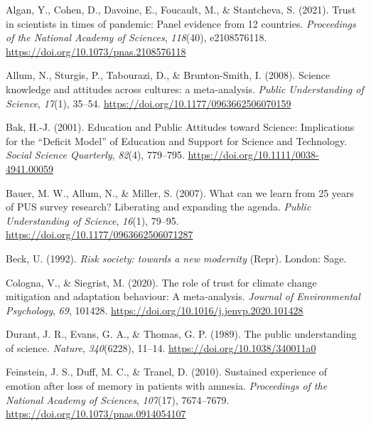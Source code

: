 \documentclass[
  doc,floatsintext]{apa6}
\newlength{\cslhangindent}
\newenvironment{CSLReferences}[2] %
 {\begin{list}{}{%
  \setlength{\itemindent}{0pt}
  \setlength{\leftmargin}{0pt}
  \setlength{\parsep}{0pt}
  \ifodd #1
   \setlength{\leftmargin}{\cslhangindent}
   \setlength{\itemindent}{-1\cslhangindent}
  \fi
  \setlength{\itemsep}{#2\baselineskip}}}
 {\end{list}}
\begin{document}
\label{refs}
\begin{CSLReferences}{1}{0}
Algan, Y., Cohen, D., Davoine, E., Foucault, M., \& Stantcheva, S. (2021). Trust in scientists in times of pandemic: Panel evidence from 12 countries. \emph{Proceedings of the National Academy of Sciences}, \emph{118}(40), e2108576118. \url{https://doi.org/10.1073/pnas.2108576118}

Allum, N., Sturgis, P., Tabourazi, D., \& Brunton-Smith, I. (2008). Science knowledge and attitudes across cultures: a meta-analysis. \emph{Public Understanding of Science}, \emph{17}(1), 35--54. \url{https://doi.org/10.1177/0963662506070159}

Bak, H.-J. (2001). Education and Public Attitudes toward Science: Implications for the {``}Deficit Model{''} of Education and Support for Science and Technology. \emph{Social Science Quarterly}, \emph{82}(4), 779--795. \url{https://doi.org/10.1111/0038-4941.00059}

Bauer, M. W., Allum, N., \& Miller, S. (2007). What can we learn from 25 years of PUS survey research? Liberating and expanding the agenda. \emph{Public Understanding of Science}, \emph{16}(1), 79--95. \url{https://doi.org/10.1177/0963662506071287}

Beck, U. (1992). \emph{Risk society: towards a new modernity} (Repr). London: Sage.

Cologna, V., \& Siegrist, M. (2020). The role of trust for climate change mitigation and adaptation behaviour: A meta-analysis. \emph{Journal of Environmental Psychology}, \emph{69}, 101428. \url{https://doi.org/10.1016/j.jenvp.2020.101428}

Durant, J. R., Evans, G. A., \& Thomas, G. P. (1989). The public understanding of science. \emph{Nature}, \emph{340}(6228), 11--14. \url{https://doi.org/10.1038/340011a0}

Feinstein, J. S., Duff, M. C., \& Tranel, D. (2010). Sustained experience of emotion after loss of memory in patients with amnesia. \emph{Proceedings of the National Academy of Sciences}, \emph{107}(17), 7674--7679. \url{https://doi.org/10.1073/pnas.0914054107}


\end{CSLReferences}
\end{document}
